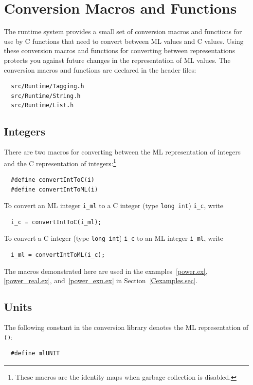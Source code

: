 \documentclass[12pt]{book}
\begin{document}
\section{Conversion Macros and Functions}
The runtime system provides a small set of conversion macros and
functions for use by C functions that need to convert between ML
values and C values. Using these conversion macros and functions for
converting between representations protects you against future
changes in the representation of ML values. The conversion macros and
functions are declared in the header
files:
\begin{verbatim}
  src/Runtime/Tagging.h
  src/Runtime/String.h
  src/Runtime/List.h
\end{verbatim}

\subsection{Integers}
There are two macros for converting between the ML representation of
integers and the C representation of integers:\footnote{These macros are the identity maps when garbage collection is disabled.}
%
%
\begin{verbatim}
  #define convertIntToC(i)
  #define convertIntToML(i)
\end{verbatim}
To convert an ML integer \verb|i_ml| to a C integer (type \texttt{long int}) \verb|i_c|,
write
\begin{verbatim}
  i_c = convertIntToC(i_ml);
\end{verbatim}
To convert a C integer (type \texttt{long int}) \verb|i_c| to an ML
 integer \verb|i_ml|, write
\begin{verbatim}
  i_ml = convertIntToML(i_c);
\end{verbatim}
The macros demonstrated here are used in the examples~\ref{power.ex},
\ref{power_real.ex}, and~\ref{power_exn.ex} in Section~\ref{Cexamples.sec}.

\subsection{Units}
The following constant in the conversion library denotes the ML
representation of {\tt ()}:
%
\begin{verbatim}
  #define mlUNIT
\end{verbatim}
\end{document}
